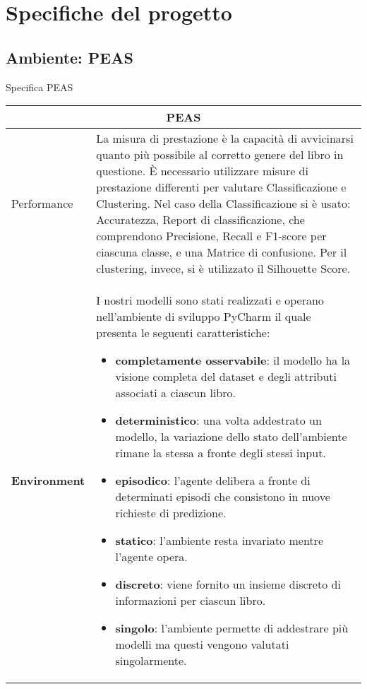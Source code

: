 \documentclass[12pt,oneside]{article}
\begin{document}
\section{Specifiche del progetto}
    \begin{enumerate}
        \subsection{Ambiente: PEAS}
    \begin{flushleft}
        Specifica PEAS
    \end{flushleft}
   
    \centering
    \begin{longtable}{ | p{3cm} | p{11cm} | }\hline
    \multicolumn{2}{|c|}{PEAS} \\ \hline
    \rowcolor{lightblue}
    Performance & La misura di prestazione è la capacità di avvicinarsi quanto più possibile al corretto genere del libro in questione. È necessario utilizzare misure di prestazione differenti per valutare Classificazione e Clustering. Nel caso della Classificazione si è usato: Accuratezza, Report di classificazione, che comprendono Precisione, Recall e F1-score per ciascuna classe, e una Matrice di  confusione. Per il clustering, invece,  si è utilizzato il Silhouette Score.\\
    \hline
    \rowcolor{lightsteelblue}
    \textbf{Environment} & I nostri modelli sono stati realizzati e operano nell'ambiente di sviluppo PyCharm il quale presenta le seguenti caratteristiche: \begin{itemize}
        \item \textbf{completamente osservabile}: il modello ha la visione completa del dataset e degli attributi associati a ciascun libro.
        \item \textbf{deterministico}: una volta addestrato un modello, la variazione dello stato dell'ambiente rimane la stessa a fronte degli stessi input.
        \item \textbf{episodico}: l'agente delibera a fronte di determinati episodi che consistono in nuove richieste di predizione.
        \item \textbf{statico}: l'ambiente resta invariato mentre l'agente opera.
        \item \textbf{discreto}: viene fornito un insieme discreto di informazioni per ciascun libro.
        \item \textbf{singolo}: l'ambiente permette di addestrare più modelli ma questi vengono valutati singolarmente.

\end{itemize}
\end{longtable}
\end{enumerate}
\end{document}
